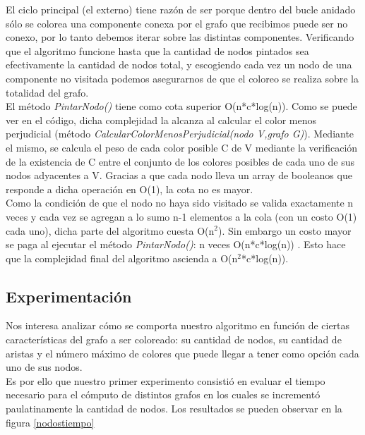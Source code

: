El ciclo principal (el externo) tiene razón de ser porque dentro del bucle anidado sólo se colorea una componente conexa por el grafo que recibimos puede ser no conexo, por lo tanto debemos iterar sobre las distintas componentes. Verificando que el algoritmo funcione hasta que la cantidad de nodos pintados sea efectivamente la cantidad de nodos total, y escogiendo cada vez un nodo de una componente no visitada podemos asegurarnos de que el coloreo se realiza sobre la totalidad del grafo.\\
El método \textit{PintarNodo()} tiene como cota superior O(n*c*log(n)). Como se puede ver en el código, dicha complejidad la alcanza al calcular el color menos perjudicial (método \textit{CalcularColorMenosPerjudicial(nodo V,grafo G)}). Mediante el mismo, se calcula el peso de cada color posible C de V mediante la verificación de la existencia de C entre el conjunto de los colores posibles de cada uno de sus nodos adyacentes a V. Gracias a que cada nodo lleva un array de booleanos que responde a dicha operación en O(1), la cota no es mayor.\\
Como la condición de que el nodo no haya sido visitado se valida exactamente n veces y cada vez se agregan a lo sumo n-1 elementos a la cola (con un costo O(1) cada uno), dicha parte del algoritmo cuesta O(n$^{2}$). Sin embargo un costo mayor se paga al ejecutar el método \textit{PintarNodo()}: n veces O(n*c*log(n)) . Esto hace que la complejidad final del algoritmo ascienda a O(n$^{2}$*c*log(n)).

\subsection{Experimentación}
Nos interesa analizar cómo se comporta nuestro algoritmo en función de ciertas características del grafo a ser coloreado: su cantidad de nodos, su cantidad de aristas y el número máximo de colores que puede llegar a tener como opción cada uno de sus nodos.\\
 Es por ello que nuestro primer experimento consistió en evaluar el tiempo necesario para el cómputo de distintos grafos en los cuales se incrementó paulatinamente la cantidad de nodos. Los resultados se pueden observar en la figura \ref{nodostiempo}

